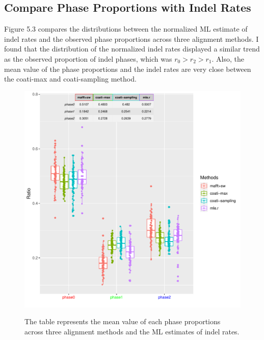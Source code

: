 \subsection{Compare Phase Proportions with Indel Rates}
Figure 5.3 compares the distributions between the normalized ML estimate of indel rates and the observed phase proportions across three alignment methods. I found that the distribution of the normalized indel rates displayed a similar trend as the observed proportion of indel phases, which was $r_0 > r_2 > r_1$. Also, the mean value of the phase proportions and the indel rates are very close between the coati-max and coati-sampling method. 
\begin{figure}[H]
     \centering
     \begin{minipage}[t]{1\textwidth}
     \includegraphics[width=1\linewidth,height=0.9\linewidth]{Fig3.pdf}
     { {The table represents the mean value of each phase proportions across three alignment methods and the ML estimates of indel rates.}  
 \par}
     \end{minipage}
\end{figure}

